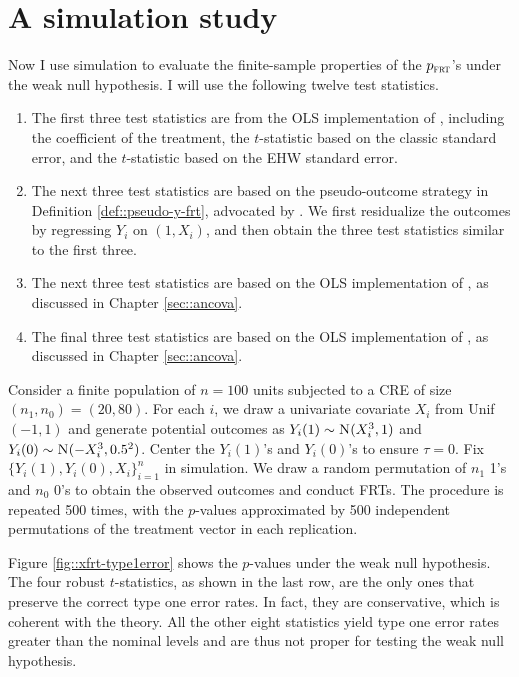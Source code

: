 \section{A simulation study}
\label{sec::simulation-xfrt-typeoneerror}




Now I use simulation to evaluate the finite-sample properties of the $p_{\textsc{frt}}$'s under the weak null hypothesis. I will use the following twelve test statistics.
\begin{enumerate}
\item
The first three test statistics are from the OLS implementation of \citet{Neyman:1923}, including the coefficient of the treatment, the $t$-statistic based on the classic standard error, and the $t$-statistic based on the EHW standard error.

\item
The next three test statistics are based on the pseudo-outcome strategy in Definition \ref{def::pseudo-y-frt}, advocated by \citet{rosenbaum2002covariance}. We first residualize the outcomes by regressing $Y_i$ on $(1,X_i)$, and then obtain the three test statistics similar to the first three.

\item
The next three test statistics are based on the OLS implementation of \citet{fisher1925statistical}, as discussed in Chapter \ref{sec::ancova}.

\item
The final three test statistics are based on the OLS implementation of \citet{lin2013}, as discussed in Chapter \ref{sec::ancova}.
\end{enumerate}

 


Consider a finite population of $n=100$ units subjected to a CRE of size $(n_1, n_0) =(20,80)$.
For each $i  $, we draw a univariate covariate $ X_i $ from Unif$(-1,1)$ and generate potential outcomes as $Y_i(1) \sim \textsc{N}(  X_i ^3 , 1)$ and $Y_i(0) \sim \textsc{N}( - X_i ^3 , 0.5^2)$.
Center the $Y_i(1)$'s and $Y_i(0)$'s  to ensure $\tau= 0$.  
Fix $\{Y_i(1), Y_i(0),  X_i \}_{ i = 1}^{n} $ in simulation. We draw a random permutation of $n_1$ 1's and $n_0$ 0's to obtain the observed outcomes and conduct FRTs. 
The procedure is repeated 500 times, with the $p$-values approximated by 500 independent permutations of the treatment vector in each replication. 



Figure \ref{fig::xfrt-type1error} shows the $p$-values under the weak null hypothesis.
The four robust $t$-statistics, as shown in the last row, are the only ones that preserve the correct type one error rates. 
In fact, they are conservative, which is coherent with the theory. 
All the other eight statistics yield type one error rates greater than the nominal levels and are thus not proper for testing the weak null hypothesis.

